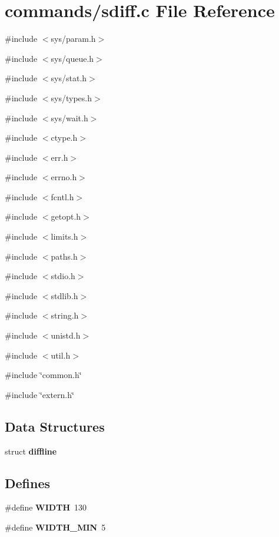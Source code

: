 \section{commands/sdiff.c File Reference}
\label{sdiff_8c}
{\ttfamily \#include $<$sys/param.h$>$}\par
{\ttfamily \#include $<$sys/queue.h$>$}\par
{\ttfamily \#include $<$sys/stat.h$>$}\par
{\ttfamily \#include $<$sys/types.h$>$}\par
{\ttfamily \#include $<$sys/wait.h$>$}\par
{\ttfamily \#include $<$ctype.h$>$}\par
{\ttfamily \#include $<$err.h$>$}\par
{\ttfamily \#include $<$errno.h$>$}\par
{\ttfamily \#include $<$fcntl.h$>$}\par
{\ttfamily \#include $<$getopt.h$>$}\par
{\ttfamily \#include $<$limits.h$>$}\par
{\ttfamily \#include $<$paths.h$>$}\par
{\ttfamily \#include $<$stdio.h$>$}\par
{\ttfamily \#include $<$stdlib.h$>$}\par
{\ttfamily \#include $<$string.h$>$}\par
{\ttfamily \#include $<$unistd.h$>$}\par
{\ttfamily \#include $<$util.h$>$}\par
{\ttfamily \#include \char`\"{}common.h\char`\"{}}\par
{\ttfamily \#include \char`\"{}extern.h\char`\"{}}\par
\subsection*{Data Structures}
\begin{DoxyCompactItemize}
\item 
struct {\bf diffline}
\end{DoxyCompactItemize}
\subsection*{Defines}
\begin{DoxyCompactItemize}
\item 
\#define {\bf WIDTH}~130
\item 
\#define {\bf WIDTH\_\-MIN}~5
\end{DoxyCompactItemize}

